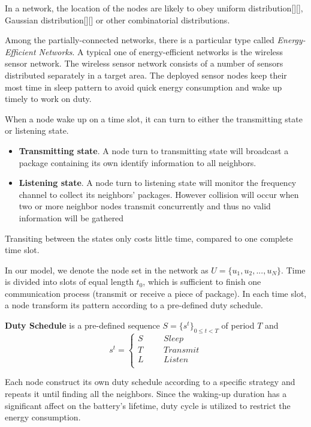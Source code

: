 In a network, the location of the nodes are likely to obey uniform distribution[][],
Gaussian distribution[][] or other combinatorial distributions.



Among the partially-connected networks, there is a particular type called \emph{Energy-Efficient Networks}.
A typical one of energy-efficient networks is the wireless sensor network.
The wireless sensor network consists of a number of sensors distributed separately in a target area.
The deployed sensor nodes keep their most time in sleep pattern to avoid quick energy consumption 
and wake up timely to work on duty.


When a node wake up on a time slot, it can turn to either the transmitting state or listening state. 
\begin{itemize}
\item \textbf{Transmitting state}. A node turn to transmitting state will broadcast a package containing its own identify 
information to all neighbors.
\item  \textbf{Listening state}. A node turn to listening state will monitor the frequency channel to collect its neighbors' packages.
However collision will occur when two or more neighbor nodes transmit concurrently and thus no valid information will be gathered
\end{itemize}
Transiting between the states only costs little time, compared to one complete time slot.

In our model, we denote the node set in the network as $U = \{u_1,u_2,...,u_N\}$.
Time is divided into slots of equal length $t_0$, 
which is sufficient to finish  one communication process
(transmit or receive a piece of package). In each time slot, 
a node transform its pattern according to a pre-defined duty schedule.


\begin{definition}
\textbf{Duty Schedule} is a pre-defined sequence $S=\{s^t\}_{0\leq t<T}$ of period $T$ and
$$ s^t=\left\{
\begin{aligned}
S  & & & {Sleep}\\
T  & & & {Transmit}\\
L  & & & {Listen}\\
\end{aligned}
\right.
$$
\end{definition}

 Each node construct its own duty schedule according to a specific strategy and repeats it
 until finding all the neighbors. Since the waking-up duration has a significant affect on the battery's lifetime, 
 duty cycle is utilized to restrict the energy consumption.

